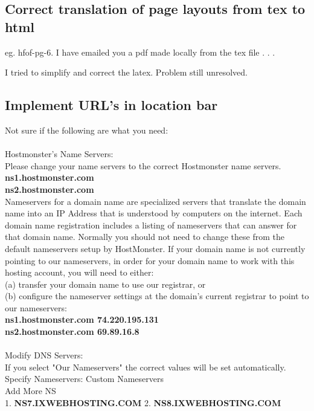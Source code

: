 \documentclass[12pt]{article}
\begin{document}
\subsection{Correct translation of page layouts from tex to html}
eg. hfof-pg-6. I have emailed you a pdf made locally from the tex file . . .

I tried to simplify and correct the latex.  Problem still unresolved.


\subsection{Implement URL's in location bar}

Not sure if the following are what you need:\\

\\
Hostmonster's Name Servers:\\
Please change your name servers to the correct Hostmonster name servers.\\
{\bf ns1.hostmonster.com \\
ns2.hostmonster.com} \\

\noindent Nameservers for a domain name are specialized servers that translate the domain name into an IP Address that is understood by computers on the internet. Each domain name registration includes a listing of nameservers that can answer for that domain name. Normally you should not need to change these from the default nameservers setup by HostMonster. If your domain name is not currently pointing to our nameservers, in order for your domain name to work with this hosting account, you will need to either:\\
(a) transfer your domain name to use our registrar, or\\
(b) configure the nameserver settings at the domain's current registrar to point to our nameservers:\\
{\bf ns1.hostmonster.com  74.220.195.131\\
ns2.hostmonster.com  69.89.16.8}\\

\\
Modify DNS Servers:\\
If you select "Our Nameservers" the correct values will be set automatically.\\
Specify Nameservers:	Custom Nameservers\\	
Add More NS\\
1.	{\bf NS7.IXWEBHOSTING.COM}	2.	{\bf NS8.IXWEBHOSTING.COM}
\end{document}
